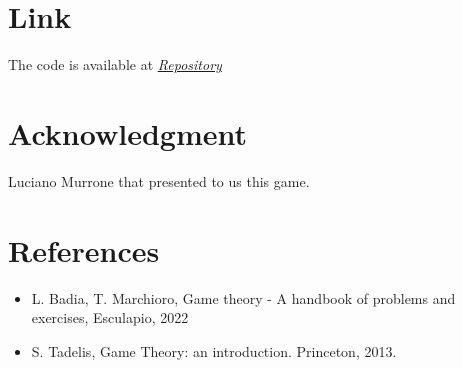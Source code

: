 \documentclass[conference]{IEEEtran}
\begin{document}
\section*{Link}
The code is available at \href{https://github.com/Sproc01/GT_PrimeComposite.git}{\textit{Repository}}

\section*{Acknowledgment}
Luciano Murrone that presented to us this game.

\section*{References}
\begin{itemize}
    \item L. Badia, T. Marchioro, Game theory - A handbook of problems and exercises, Esculapio, 2022
    \item S. Tadelis, Game Theory: an introduction. Princeton, 2013.
\end{itemize}
\end{document}
